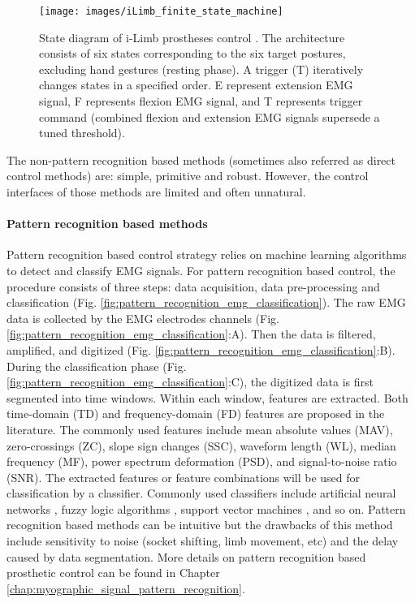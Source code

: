  \begin{figure}[ht!]
    \centering
        \texttt{[image: images/iLimb\_finite\_state\_machine]}
        \caption{State diagram of i-Limb prostheses control \cite{segil2014comparative}. The architecture consists of six states corresponding to the six target postures, excluding hand gestures (resting phase). A trigger (T) iteratively changes states in a specified order. E represent extension EMG signal, F represents flexion EMG signal, and T represents trigger command (combined flexion and extension EMG signals supersede a tuned threshold). }
        \label{fig:iLimb_finite_state_machine}
\end{figure}

The non-pattern recognition based methods (sometimes also referred as direct control methods) are: simple, primitive and robust. However, the control interfaces of those methods are limited and often unnatural. 


\paragraph{Pattern recognition based methods}
Pattern recognition based control strategy relies on machine learning algorithms to detect and classify EMG signals. 
For pattern recognition based control, the procedure consists of three steps: data acquisition, data pre-processing and classification (Fig. \ref{fig:pattern_recognition_emg_classification}). The raw EMG data is collected by the EMG electrodes channels (Fig. \ref{fig:pattern_recognition_emg_classification}:A). Then the data is filtered, amplified, and digitized (Fig. \ref{fig:pattern_recognition_emg_classification}:B). During the classification phase  (Fig. \ref{fig:pattern_recognition_emg_classification}:C), the digitized data is first segmented into time windows. Within each window, features are extracted. Both time-domain (TD) and frequency-domain (FD) features are proposed in the literature. The commonly used features include mean absolute values (MAV), zero-crossings (ZC), slope sign changes (SSC), waveform length (WL), median frequency (MF), power spectrum deformation (PSD), and signal-to-noise ratio (SNR). The extracted features or feature combinations will be used for classification by a classifier. Commonly used classifiers include artificial neural networks \cite{hiraiwa1989emg, uchida1992emg, gupta2017emg}, fuzzy logic algorithms \cite{chan2000fuzzy, micera1999hybrid}, support vector machines \cite{oskoei2008support}, and so on.  Pattern recognition based methods can be intuitive but the drawbacks of this method include sensitivity to noise (socket shifting, limb movement, etc) and the delay caused by data segmentation. More details on pattern recognition based prosthetic control can be found in Chapter \ref{chap:myographic_signal_pattern_recognition}. 



